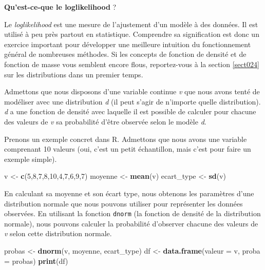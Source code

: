 \documentclass[
  11pt,
  french,
]{book}
\makeatletter
\newenvironment{Shaded}{\begin{snugshade}}{\end{snugshade}}
\newcommand{\DataTypeTok}[1]{\textcolor[rgb]{0.13,0.29,0.53}{#1}}
\newcommand{\DecValTok}[1]{\textcolor[rgb]{0.00,0.00,0.81}{#1}}
\newcommand{\KeywordTok}[1]{\textcolor[rgb]{0.13,0.29,0.53}{\textbf{#1}}}
\newcommand{\NormalTok}[1]{#1}
\newcommand{\StringTok}[1]{\textcolor[rgb]{0.31,0.60,0.02}{#1}}
\newenvironment{kframe}{%
\medskip{}
\setlength{\fboxsep}{.8em}
 \def\at@end@of@kframe{}%
 \ifinner\ifhmode%
  \def\at@end@of@kframe{\end{minipage}}%
  \begin{minipage}{\columnwidth}%
 \fi\fi%
 \def\FrameCommand##1{\hskip\@totalleftmargin \hskip-\fboxsep
 \colorbox{shadecolor}{##1}\hskip-\fboxsep
     \hskip-\linewidth \hskip-\@totalleftmargin \hskip\columnwidth}%
 \MakeFramed {\advance\hsize-\width
   \@totalleftmargin\z@ \linewidth\hsize
   \@setminipage}}%
 {\par\unskip\endMakeFramed%
 \at@end@of@kframe}
\newenvironment{kframev}{%
\medskip{}
\setlength{\fboxsep}{.8em}
 \def\at@end@of@kframev{}%
 \ifinner\ifhmode%
  \def\at@end@of@kframev{\end{minipage}}%
  \begin{minipage}{\columnwidth}%
 \fi\fi%
 \def\FrameCommand##1{\hskip\@totalleftmargin \hskip-\fboxsep
 \colorbox{shadebluecolor}{##1}\hskip-\fboxsep
     \hskip-\linewidth \hskip-\@totalleftmargin \hskip\columnwidth}%
 \MakeFramed {\advance\hsize-\width
   \@totalleftmargin\z@ \linewidth\hsize
   \@setminipage}}%
 {\par\unskip\endMakeFramed%
 \at@end@of@kframev}
\renewenvironment{Shaded}{\begin{kframe}}{\end{kframe}}
\newenvironment{rmdblock}[1]
  {
  \begin{itemize}
  \renewcommand{\labelitemi}{
    \raisebox{-.7\height}[0pt][0pt]{
      {\setkeys{Gin}{width=3em,keepaspectratio}\texttt{[image: images/\#1]}}
    }
  }
  \setlength{\fboxsep}{1em}
  \begin{kframev}
  \small
  \item
  }
  {
  \end{kframev}
  \end{itemize}
  }
\newenvironment{bloc_aller_loin}
  {\begin{rmdblock}{aller_loin}}
  {\end{rmdblock}}
\makeatother
\begin{document}
\begin{bloc_aller_loin}
\textbf{Qu'est-ce-que le loglikelihood} ?

Le \emph{loglikelihood} est une mesure de l'ajustement d'un modèle à des données. Il est utilisé à peu près partout en statistique. Comprendre sa signification est donc un exercice important pour développer une meilleure intuition du fonctionnement général de nombreuses méthodes. Si les concepts de fonction de densité et de fonction de masse vous semblent encore flous, reportez-vous à la section \ref{sect024} sur les distributions dans un premier temps.

Admettons que nous disposons d'une variable continue \emph{v} que nous avons tenté de modéliser avec une distribution \emph{d} (il peut s'agir de n'importe quelle distribution). \emph{d} a une fonction de densité avec laquelle il est possible de calculer pour chacune des valeurs de \emph{v} sa probabilité d'être observée selon le modèle \emph{d}.

Prenons un exemple concret dans R. Admettons que nous avons une variable comprenant 10 valeurs (oui, c'est un petit échantillon, mais c'est pour faire un exemple simple).

\begin{Shaded}
\begin{Highlighting}[]
\NormalTok{v <-}\StringTok{ }\KeywordTok{c}\NormalTok{(}\DecValTok{5}\NormalTok{,}\DecValTok{8}\NormalTok{,}\DecValTok{7}\NormalTok{,}\DecValTok{8}\NormalTok{,}\DecValTok{10}\NormalTok{,}\DecValTok{4}\NormalTok{,}\DecValTok{7}\NormalTok{,}\DecValTok{6}\NormalTok{,}\DecValTok{9}\NormalTok{,}\DecValTok{7}\NormalTok{)}
\NormalTok{moyenne <-}\StringTok{ }\KeywordTok{mean}\NormalTok{(v)}
\NormalTok{ecart_type <-}\StringTok{ }\KeywordTok{sd}\NormalTok{(v)}
\end{Highlighting}
\end{Shaded}

En calculant sa moyenne et son écart type, nous obtenons les paramètres d'une distribution normale que nous pouvons utiliser pour représenter les données observées. En utilisant la fonction \texttt{dnorm} (la fonction de densité de la distribution normale), nous pouvons calculer la probabilité d'observer chacune des valeurs de \emph{v} selon cette distribution normale.

\begin{Shaded}
\begin{Highlighting}[]
\NormalTok{probas <-}\StringTok{ }\KeywordTok{dnorm}\NormalTok{(v, moyenne, ecart_type)}
\NormalTok{df <-}\StringTok{ }\KeywordTok{data.frame}\NormalTok{(}\DataTypeTok{valeur =}\NormalTok{ v,}
                 \DataTypeTok{proba =}\NormalTok{ probas)}
\KeywordTok{print}\NormalTok{(df)}
\end{Highlighting}
\end{Shaded}


\end{bloc_aller_loin}
\end{document}
